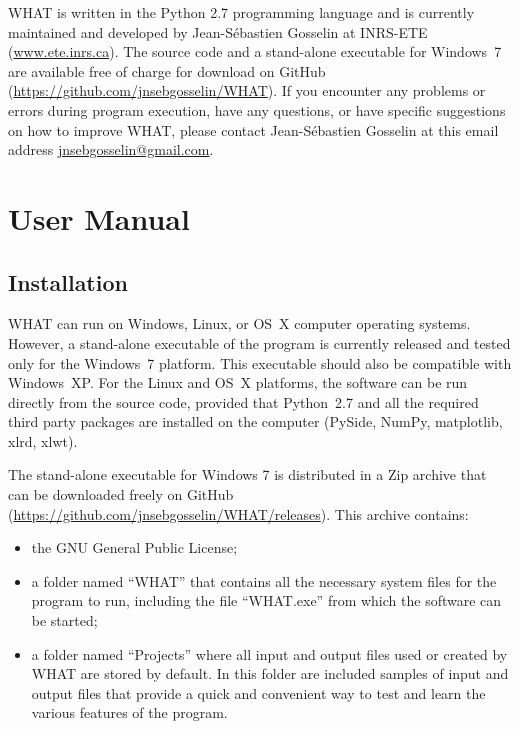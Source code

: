 \documentclass[12pt, letterpaper, fleqn]{report}
\begin{document}
WHAT is written in the Python 2.7 programming language and is currently maintained and developed by Jean-S\'ebastien Gosselin at INRS-ETE (\url{www.ete.inrs.ca}). The source code and a stand-alone executable for Windows 7 are available free of charge for download on GitHub (\url{https://github.com/jnsebgosselin/WHAT}). If you encounter any problems or errors during program execution, have any questions, or have specific suggestions on how to improve WHAT, please contact Jean-S\'ebastien Gosselin at this email address \href{mailto:jnsebgosselin@gmail.com}{jnsebgosselin@gmail.com}.

\chapter{User Manual}

\section{Installation}\label{sec:intallation}

WHAT can run on Windows, Linux, or OS X computer operating systems. However, a stand-alone executable of the program is currently released and tested only for the Windows 7 platform. This executable should also be compatible with Windows XP. For the Linux and OS X platforms, the software can be run directly from the source code, provided that Python 2.7 and all the required third party packages are installed on the computer (PySide, NumPy, matplotlib, xlrd, xlwt).

The stand-alone executable for Windows 7 is distributed in a Zip archive that can be downloaded freely on GitHub (\url{https://github.com/jnsebgosselin/WHAT/releases}). This archive contains:

\begin{itemize}

\item{the GNU General Public License;}

\item{a folder named ``WHAT'' that contains all the necessary system files for the program to run, including the file ``WHAT.exe'' from which the software can be started;}

\item{a folder named ``Projects'' where all input and output files used or created by WHAT are stored by default. In this folder are included samples of input and output files that provide a quick and convenient way to test and learn the various features of the program.}

\end{itemize}
\end{document}
